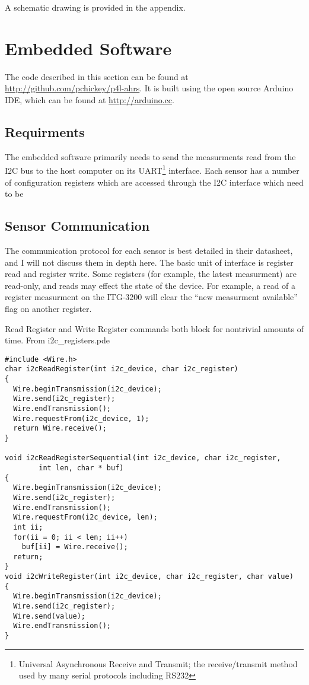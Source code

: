 \documentclass[12pt]{report}
\begin{document}

A schematic drawing is provided in the appendix. %

\lstset{language=C++,basicstyle=\ttfamily}
\section{Embedded Software}
The code described in this section can be found at \url{http://github.com/pchickey/p4l-ahrs}. It is built using the open source Arduino IDE, which can be found at \url{http://arduino.cc}.

\subsection{Requirments}
The embedded software primarily needs to send the measurments read from the I2C bus to the host computer on its 
UART\footnote{Universal Asynchronous Receive and Transmit; the receive/transmit method used by many serial protocols including RS232} 
interface. Each sensor has a number of configuration registers which are accessed through the I2C interface which need to be 

\subsection{Sensor Communication}

The communication protocol for each sensor is best detailed in their datasheet, and I will not discuss them in depth here. The basic unit of interface is register read and register write. Some registers (for example, the latest measurment) are read-only, and reads may effect the state of the device. For example, a read of a register measurment on the ITG-3200 will clear the ``new measurment available'' flag on another register.   

Read Register and Write Register commands both block for nontrivial amounts of time.
\lstset{language=C++,basicstyle=\ttfamily}
From i2c\_registers.pde
\begin{lstlisting}
#include <Wire.h>
char i2cReadRegister(int i2c_device, char i2c_register)
{
  Wire.beginTransmission(i2c_device);
  Wire.send(i2c_register);
  Wire.endTransmission();
  Wire.requestFrom(i2c_device, 1);
  return Wire.receive();  
}

void i2cReadRegisterSequential(int i2c_device, char i2c_register, 
        int len, char * buf)
{
  Wire.beginTransmission(i2c_device);
  Wire.send(i2c_register);
  Wire.endTransmission();
  Wire.requestFrom(i2c_device, len);
  int ii;
  for(ii = 0; ii < len; ii++)
    buf[ii] = Wire.receive();
  return;
}
void i2cWriteRegister(int i2c_device, char i2c_register, char value)
{
  Wire.beginTransmission(i2c_device);
  Wire.send(i2c_register);
  Wire.send(value);
  Wire.endTransmission();
}  
\end{lstlisting}
\end{document}
